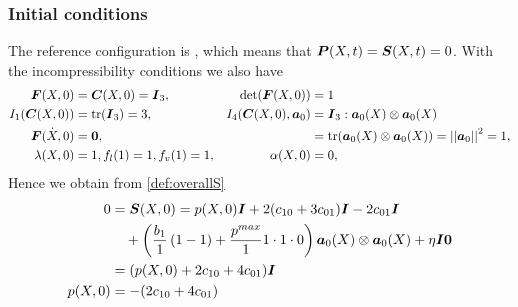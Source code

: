 \subsubsection{Initial conditions}
The reference configuration is , which means that $\boldsymbol{P}(X,t) = \boldsymbol{S}(X,t) = 0$.
With the incompressibility conditions we also have
\begin{align*}
	\boldsymbol{F}(X,0) &= \boldsymbol{C}(X,0) = \boldsymbol{I}_3, & \det(\boldsymbol{F}(X,0)) &= 1\\
	I_1(\boldsymbol{C}(X,0)) &= \operatorname{tr}(\boldsymbol{I}_3) = 3, & I_4(\boldsymbol{C}(X,0),\boldsymbol{a}_0) & = \boldsymbol{I}_3 : \boldsymbol{a}_0(X)\otimes\boldsymbol{a}_0(X)\\
		\dot{\boldsymbol{F}(X,0)}&=\boldsymbol{0},&&	= \operatorname{tr}(\boldsymbol{a}_0(X)\otimes\boldsymbol{a}_0(X)) = \left|\left|\boldsymbol{a}_0\right|\right|_{}^2 = 1,\\
		\lambda(X,0) &= 1, f_l(1) = 1, f_v(1) = 1, & \alpha(X,0) &= 0,
\end{align*}
Hence we obtain from \eqref{def:overallS}
\begin{align}
	0 &= \boldsymbol{S}(X,0) = p(X,0)\boldsymbol{I} + 2(c_{10} + 3c_{01})\boldsymbol{I} - 2c_{01}\boldsymbol{I}\\
			 &\quad+\left(\frac{b_1}{1}\left(1 - 1\right)+\frac{p^{max}}{1}1\cdot1\cdot0\right)\boldsymbol{a}_0(X)\otimes\boldsymbol{a}_0(X)
			 +\eta\boldsymbol{I}\boldsymbol{0}\nonumber\\
			 & = (p(X,0) + 2c_{10} + 4c_{01})\boldsymbol{I}\\
			 p(X,0) &= -(2c_{10} + 4c_{01})
\end{align}

